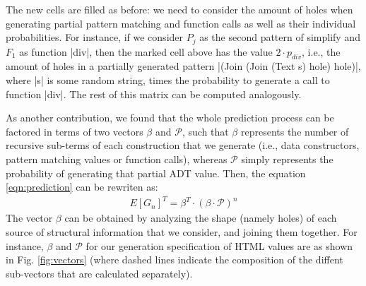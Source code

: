 The new cells are filled as before: we need to consider the amount of holes when
generating partial pattern matching and function calls as well as their
individual probabilities.
%
%
For instance, if we consider $P_j$ as the second pattern of simplify and $F_1$
as function |div|, then the marked cell above has the value $2\cdot p_{div}$,
i.e., the amount of holes in a partially generated pattern |(Join (Join (Text s)
hole) hole)|, where |s| is some random string, times the probability to generate
a call to function |div|.
%
The rest of this matrix can be computed analogously.

%

As another contribution, we found that the whole prediction process can be
factored in terms of two vectors $\beta$ and $\mathcal{P}$, such that $\beta$
represents the number of recursive sub-terms of each construction that we
generate (i.e., data constructors, pattern matching values or function calls),
whereas $\mathcal{P}$ simply represents the probability of generating that
partial ADT value.%
%
Then, the equation \ref{eqn:prediction} can be rewriten as:
%
\begin{align*}
  E[G_n]^T = \beta^T \cdot (\beta \cdot \mathcal{P})^{n}
\end{align*}
%
The vector $\beta$ can be obtained by analyzing the shape (namely holes) of each
source of structural information that we consider, and joining them together.
%
For instance, $\beta$ and $\mathcal{P}$ for our generation specification of HTML
values are as shown in Fig. \ref{fig:vectors} (where dashed lines indicate the
composition of the diffent sub-vectors that are calculated separately).


